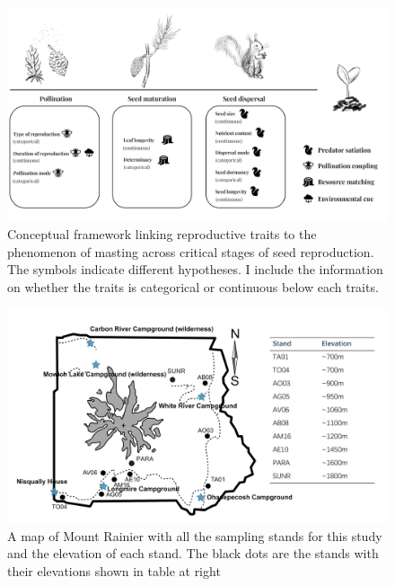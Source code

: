 \documentclass[11pt,letter]{article}
\begin{document}
\begin{figure}[htb]
	\centering
	\includegraphics[width=1\linewidth]{conceptualChap1.png}
	\caption{Conceptual framework linking reproductive traits to the phenomenon of masting across critical stages of seed reproduction. The symbols indicate different hypotheses. I include the information on whether the traits is categorical or continuous below each traits.}
	\label{fig:conceptual1}
\end{figure}
\begin{figure}[htb]
	\centering
	\includegraphics[width=1\linewidth]{rainierMap.png}
	\caption{A map of Mount Rainier with all the sampling stands for this study and the elevation of each stand. The black dots are the stands with their elevations shown in table at right}
	\label{fig:sites}
\end{figure}
\end{document}
